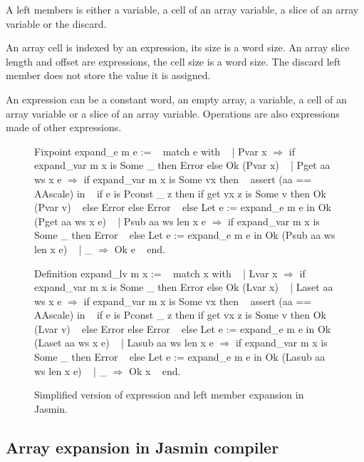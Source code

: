\documentclass{article}
\begin{document}
\smallskip

A left members is either a variable, a cell of an array variable, a slice of an
array variable or the discard.

An array cell is indexed by an expression, its size is a word size. An array
slice length and offset are expressions, the cell size is a word size. The
discard left member does not store the value it is assigned.

An expression can be a constant word, an empty array, a variable, a cell of an
array variable or a slice of an array variable. Operations are also expressions
made of other expressions.

\begin{figure}[t]
\obeylines\obeyspaces\ttfamily%
Fixpoint expand\_e m e := 
~ match e with
~ | Pvar x \(\Rightarrow\) if expand\_var m x is Some \_ then Error else Ok (Pvar x)
~ | Pget aa ws x e \(\Rightarrow\) if expand\_var m x is Some vx then
~     assert (aa == AAscale) in
~     if e is Pconst \_ z then if get vx z is Some v then Ok (Pvar v)
~     else Error else Error
~   else Let e := expand\_e m e in Ok (Pget aa ws x e)
~ | Psub aa ws len x e \(\Rightarrow\) if expand\_var m x is Some \_ then Error
~   else Let e := expand\_e m e in Ok (Psub aa ws len x e)
~ | \_ \(\Rightarrow\) Ok e
~ end.

Definition expand\_lv m x :=
~ match x with
~ | Lvar x \(\Rightarrow\) if expand\_var m x is Some \_ then Error else Ok (Lvar x)
~ | Laset aa ws x e \(\Rightarrow\) if expand\_var m x is Some vx then
~     assert (aa == AAscale) in
~     if e is Pconst \_ z then if get vx z is Some v then Ok (Lvar v)
~     else Error else Error
~   else Let e := expand\_e m e in Ok (Laset aa ws x e)
~ | Lasub aa ws len x e \(\Rightarrow\) if expand\_var m x is Some \_ then Error
~   else Let e := expand\_e m e in Ok (Lasub aa ws len x e)
~ | \_ \(\Rightarrow\) Ok x
~ end.
\normalfont%
\caption{Simplified version of expression and left member expansion in Jasmin.}
\end{figure}

\subsection{Array expansion in Jasmin compiler}
\end{document}

